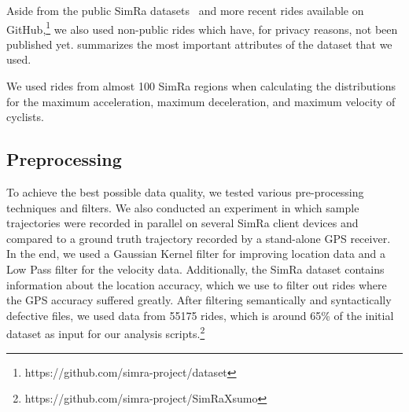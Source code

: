 Aside from the public SimRa datasets~\cite{dataset_simra_set1,dataset_simra_set2, dataset_simra_set3} and more recent rides available on GitHub,\footnote{https://github.com/simra-project/dataset} we also used non-public rides which have, for privacy reasons, not been published yet.
 summarizes the most important attributes of the dataset that we used.

We used rides from almost \num{100} SimRa regions when calculating the distributions for the maximum acceleration, maximum deceleration, and maximum velocity of cyclists.

\subsection{Preprocessing}
\label{subsec:preprocessing_sumo}
To achieve the best possible data quality, we tested various pre-processing techniques and filters.
We also conducted an experiment in which sample trajectories were recorded in parallel on several SimRa client devices and compared to a ground truth trajectory recorded by a stand-alone GPS receiver.
In the end, we used a Gaussian Kernel filter for improving location data and a Low Pass filter for the velocity data.
Additionally, the SimRa dataset contains information about the location accuracy, which we use to filter out rides where the GPS accuracy suffered greatly.
After filtering semantically and syntactically defective files, we used data from \num{55175} rides, which is around \num{65}\% of the initial dataset as input for our analysis scripts.\footnote{https://github.com/simra-project/SimRaX\ac{sumo}}
